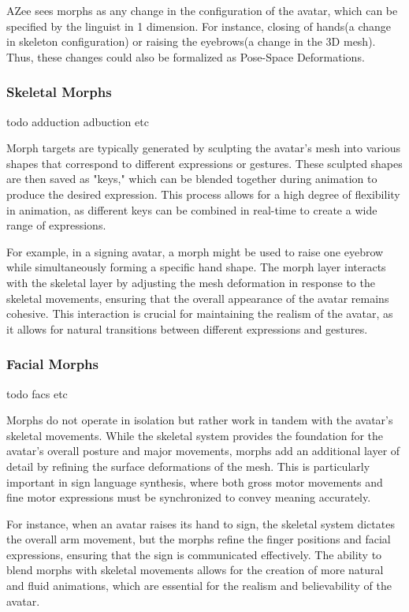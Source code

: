 \documentclass[../../main.tex]{subfiles}
\begin{document}
AZee sees morphs as any change in the configuration of the avatar, which can be specified by the linguist in 1 dimension. For instance, closing of hands(a change in skeleton configuration) or raising the eyebrows(a change in the 3D mesh). Thus, these changes could also be formalized as Pose-Space Deformations.

\subsubsection{Skeletal Morphs}
\label{subsec:skel_morphs}

todo adduction adbuction etc

Morph targets are typically generated by sculpting the avatar's mesh into various shapes that correspond to different expressions or gestures. These sculpted shapes are then saved as "keys," which can be blended together during animation to produce the desired expression. This process allows for a high degree of flexibility in animation, as different keys can be combined in real-time to create a wide range of expressions.

For example, in a signing avatar, a morph might be used to raise one eyebrow while simultaneously forming a specific hand shape. The morph layer interacts with the skeletal layer by adjusting the mesh deformation in response to the skeletal movements, ensuring that the overall appearance of the avatar remains cohesive. This interaction is crucial for maintaining the realism of the avatar, as it allows for natural transitions between different expressions and gestures.

\subsubsection{Facial Morphs}
\label{subsubsec:facial_morphs}

todo facs etc

Morphs do not operate in isolation but rather work in tandem with the avatar's skeletal movements. While the skeletal system provides the foundation for the avatar's overall posture and major movements, morphs add an additional layer of detail by refining the surface deformations of the mesh. This is particularly important in sign language synthesis, where both gross motor movements and fine motor expressions must be synchronized to convey meaning accurately.

For instance, when an avatar raises its hand to sign, the skeletal system dictates the overall arm movement, but the morphs refine the finger positions and facial expressions, ensuring that the sign is communicated effectively. The ability to blend morphs with skeletal movements allows for the creation of more natural and fluid animations, which are essential for the realism and believability of the avatar.
\end{document}
